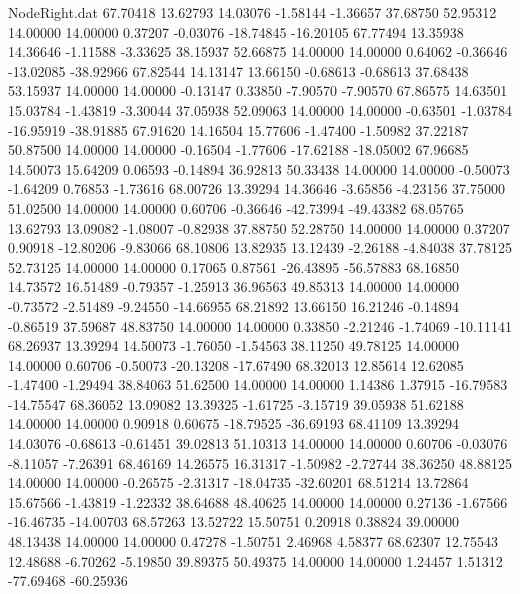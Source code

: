 \begin{filecontents}{NodeRight.dat}
  67.70418   13.62793   14.03076    -1.58144   -1.36657   37.68750   52.95312   14.00000   14.00000    0.37207   -0.03076  -18.74845  -16.20105
  67.77494   13.35938   14.36646    -1.11588   -3.33625   38.15937   52.66875   14.00000   14.00000    0.64062   -0.36646  -13.02085  -38.92966
  67.82544   14.13147   13.66150    -0.68613   -0.68613   37.68438   53.15937   14.00000   14.00000   -0.13147    0.33850   -7.90570   -7.90570
  67.86575   14.63501   15.03784    -1.43819   -3.30044   37.05938   52.09063   14.00000   14.00000   -0.63501   -1.03784  -16.95919  -38.91885
  67.91620   14.16504   15.77606    -1.47400   -1.50982   37.22187   50.87500   14.00000   14.00000   -0.16504   -1.77606  -17.62188  -18.05002
  67.96685   14.50073   15.64209     0.06593   -0.14894   36.92813   50.33438   14.00000   14.00000   -0.50073   -1.64209    0.76853   -1.73616
  68.00726   13.39294   14.36646    -3.65856   -4.23156   37.75000   51.02500   14.00000   14.00000    0.60706   -0.36646  -42.73994  -49.43382
  68.05765   13.62793   13.09082    -1.08007   -0.82938   37.88750   52.28750   14.00000   14.00000    0.37207    0.90918  -12.80206   -9.83066
  68.10806   13.82935   13.12439    -2.26188   -4.84038   37.78125   52.73125   14.00000   14.00000    0.17065    0.87561  -26.43895  -56.57883
  68.16850   14.73572   16.51489    -0.79357   -1.25913   36.96563   49.85313   14.00000   14.00000   -0.73572   -2.51489   -9.24550  -14.66955
  68.21892   13.66150   16.21246    -0.14894   -0.86519   37.59687   48.83750   14.00000   14.00000    0.33850   -2.21246   -1.74069  -10.11141
  68.26937   13.39294   14.50073    -1.76050   -1.54563   38.11250   49.78125   14.00000   14.00000    0.60706   -0.50073  -20.13208  -17.67490
  68.32013   12.85614   12.62085    -1.47400   -1.29494   38.84063   51.62500   14.00000   14.00000    1.14386    1.37915  -16.79583  -14.75547
  68.36052   13.09082   13.39325    -1.61725   -3.15719   39.05938   51.62188   14.00000   14.00000    0.90918    0.60675  -18.79525  -36.69193
  68.41109   13.39294   14.03076    -0.68613   -0.61451   39.02813   51.10313   14.00000   14.00000    0.60706   -0.03076   -8.11057   -7.26391
  68.46169   14.26575   16.31317    -1.50982   -2.72744   38.36250   48.88125   14.00000   14.00000   -0.26575   -2.31317  -18.04735  -32.60201
  68.51214   13.72864   15.67566    -1.43819   -1.22332   38.64688   48.40625   14.00000   14.00000    0.27136   -1.67566  -16.46735  -14.00703
  68.57263   13.52722   15.50751     0.20918    0.38824   39.00000   48.13438   14.00000   14.00000    0.47278   -1.50751    2.46968    4.58377
  68.62307   12.75543   12.48688    -6.70262   -5.19850   39.89375   50.49375   14.00000   14.00000    1.24457    1.51312  -77.69468  -60.25936

\end{filecontents}
